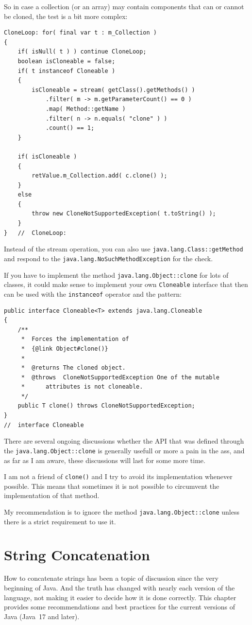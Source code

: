 \documentclass[11pt,a4paper, titlepage, parskip=half, headsepline, footsepline, cleardoublepage=current, headheight=1cm]{scrbook}
\begin{document}
So in case a collection (or an array) may contain components that can or cannot be cloned, the test is a bit more complex:
\begin{lstlisting}
CloneLoop: for( final var t : m_Collection ) 
{
    if( isNull( t ) ) continue CloneLoop;
    boolean isCloneable = false;
    if( t instanceof Cloneable )
    {
    	isCloneable = stream( getClass().getMethods() )
    	    .filter( m -> m.getParameterCount() == 0 )
    	    .map( Method::getName )
    	    .filter( n -> n.equals( "clone" ) )
    	    .count() == 1;
    }
    
    if( isCloneable )
    {
        retValue.m_Collection.add( c.clone() );
    }
    else
    {
        throw new CloneNotSupportedException( t.toString() );
    }    
}   //  CloneLoop:
\end{lstlisting}
Instead of the stream operation, you can also use \lstinline|java.lang.Class::getMethod| and respond to the \lstinline|java.lang.NoSuchMethodException| for the check.

If you have to implement the method \lstinline|java.lang.Object::clone| for lots of classes, it could make sense to implement your own \lstinline|Cloneable| interface that then can be used with the \lstinline|instanceof| operator and the pattern:
\begin{lstlisting}
public interface Cloneable<T> extends java.lang.Cloneable
{
    /**
     *  Forces the implementation of
     *  {@link Object#clone()}
     *
     *  @returns The cloned object.
     *  @throws  CloneNotSupportedException One of the mutable
     *      attributes is not cloneable.
     */
    public T clone() throws CloneNotSupportedException; 
}
//  interface Cloneable
\end{lstlisting}

There are several ongoing discussions whether the API that was defined through the \lstinline|java.lang.Object::clone| is generally usefull or more a pain in the ass, and as far as I am aware, these discussions will last for some more time.

I am not a friend of \lstinline|clone()| and I try to avoid its implementation whenever possible. This means that sometimes it is not possible to circumvent the implementation of that method.

My recommendation is to ignore the method \lstinline|java.lang.Object::clone| unless there is a strict requirement to use it.

\section{String Concatenation}
How to concatenate strings has been a topic of discussion since the very beginning of Java. And the truth has changed with nearly each version of the language, not making it easier to decide how it is done correctly. This chapter provides some recommendations and best practices for the current versions of Java (Java~17 and later).
\end{document}
